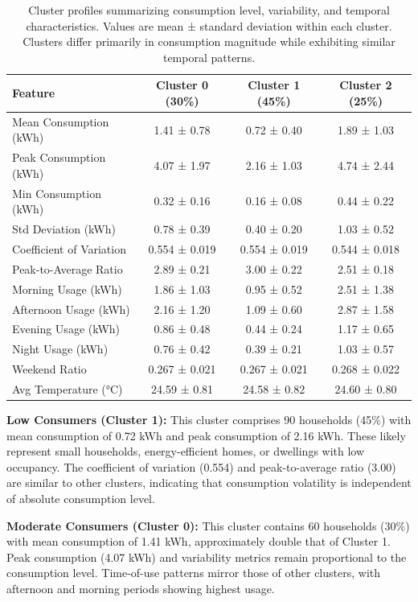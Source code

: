 \documentclass[11pt]{article}
\begin{document}
\begin{table}[ht]
\centering
\caption{Cluster profiles summarizing consumption level, variability, and temporal characteristics. Values are mean ± standard deviation within each cluster. Clusters differ primarily in consumption magnitude while exhibiting similar temporal patterns.}
\label{tab:cluster_profiles}
\small
\begin{tabular}{lccc}
\toprule
\textbf{Feature} & \textbf{Cluster 0 (30\%)} & \textbf{Cluster 1 (45\%)} & \textbf{Cluster 2 (25\%)} \\
\midrule
Mean Consumption (kWh) & 1.41 ± 0.78 & 0.72 ± 0.40 & 1.89 ± 1.03 \\
Peak Consumption (kWh) & 4.07 ± 1.97 & 2.16 ± 1.03 & 4.74 ± 2.44 \\
Min Consumption (kWh) & 0.32 ± 0.16 & 0.16 ± 0.08 & 0.44 ± 0.22 \\
Std Deviation (kWh) & 0.78 ± 0.39 & 0.40 ± 0.20 & 1.03 ± 0.52 \\
Coefficient of Variation & 0.554 ± 0.019 & 0.554 ± 0.019 & 0.544 ± 0.018 \\
Peak-to-Average Ratio & 2.89 ± 0.21 & 3.00 ± 0.22 & 2.51 ± 0.18 \\
Morning Usage (kWh) & 1.86 ± 1.03 & 0.95 ± 0.52 & 2.51 ± 1.38 \\
Afternoon Usage (kWh) & 2.16 ± 1.20 & 1.09 ± 0.60 & 2.87 ± 1.58 \\
Evening Usage (kWh) & 0.86 ± 0.48 & 0.44 ± 0.24 & 1.17 ± 0.65 \\
Night Usage (kWh) & 0.76 ± 0.42 & 0.39 ± 0.21 & 1.03 ± 0.57 \\
Weekend Ratio & 0.267 ± 0.021 & 0.267 ± 0.021 & 0.268 ± 0.022 \\
Avg Temperature (°C) & 24.59 ± 0.81 & 24.58 ± 0.82 & 24.60 ± 0.80 \\
\bottomrule
\end{tabular}
\end{table}

\textbf{Low Consumers (Cluster 1):} This cluster comprises 90 households (45\%) with mean consumption of 0.72 kWh and peak consumption of 2.16 kWh. These likely represent small households, energy-efficient homes, or dwellings with low occupancy. The coefficient of variation (0.554) and peak-to-average ratio (3.00) are similar to other clusters, indicating that consumption volatility is independent of absolute consumption level.

\textbf{Moderate Consumers (Cluster 0):} This cluster contains 60 households (30\%) with mean consumption of 1.41 kWh, approximately double that of Cluster 1. Peak consumption (4.07 kWh) and variability metrics remain proportional to the consumption level. Time-of-use patterns mirror those of other clusters, with afternoon and morning periods showing highest usage.
\end{document}

